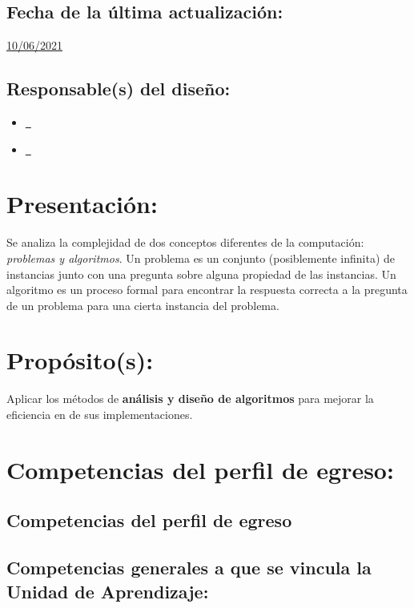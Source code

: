 \documentclass[10 pt]{article}
\begin{document}
\subsection{Fecha de la \'{u}ltima actualizaci\'{o}n:} \underline{10/06/2021}
\subsection{Responsable(s) del dise\~{n}o:}
\begin{itemize}[label={}]
\item \underline{\nferny~\ferny}
\item \underline{\nelisa~\elisa}
\end{itemize}
\newpage
\section{Presentaci\'{o}n:}

Se analiza la complejidad de dos conceptos diferentes de la
computaci\'{o}n: {\em problemas y algoritmos}. Un problema es un
conjunto (posiblemente infinita) de instancias junto con una pregunta
sobre alguna propiedad de las instancias.  Un algoritmo es un proceso
formal para encontrar la respuesta correcta a la pregunta de un
problema para una cierta instancia del problema. 
  
\section{Prop\'{o}sito(s):}

Aplicar los m\'{e}todos de {\bf an\'{a}lisis y dise\~{n}o de
  algoritmos} para mejorar la eficiencia en de sus implementaciones.

\section{Competencias del perfil de egreso:}
\subsection{Competencias del perfil de egreso}








\subsection{Competencias generales a que se vincula la Unidad de
    Aprendizaje:}
\end{document}
